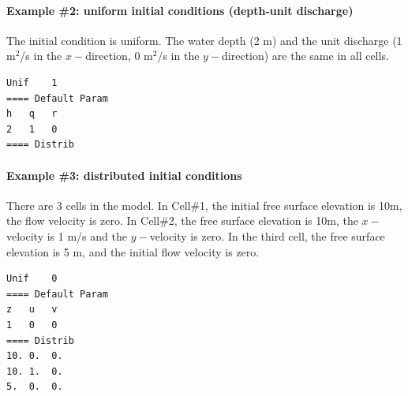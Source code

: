 \paragraph*{Example \#2: uniform initial conditions (depth-unit discharge)}
The initial condition is uniform. The water depth (2 m) and the unit discharge (1 m$^2$/s in the $x-$direction, 0 m$^2$/s in the $y-$direction) are the same in all cells.
\begin{verbatim}
Unif	1
==== Default Param
h	q	r
2	1	0
==== Distrib
\end{verbatim}
%
\paragraph*{Example \#3: distributed initial conditions}
There are 3 cells in the model. In Cell\#1, the initial free surface elevation is 10m, the flow velocity is zero. In Cell\#2, the free surface elevation is 10m, the $x-$velocity is 1 m/s and the $y-$velocity is zero. In the third cell, the free surface elevation is 5 m, and the initial flow velocity is zero. 
\begin{verbatim}
Unif	0
==== Default Param
z	u	v
1	0	0
==== Distrib
10. 0.  0.
10. 1.  0.
5.  0.  0.
\end{verbatim}